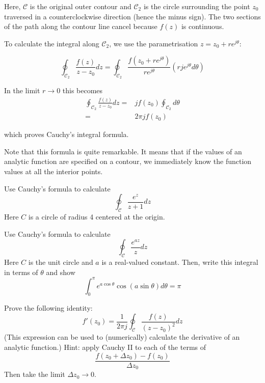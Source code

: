 Here, $\mathcal{C}$ is the original outer contour and $\mathcal{C}_2$ is the
circle surrounding the point $z_0$ traversed in a counterclockwise direction
(hence the minus sign). The two sections of the path along the contour line
cancel because $f(z)$ is continuous.

To calculate the integral along $\mathcal{C}_2$, we use the parametrisation
$z=z_0 + r e^{j\theta}$:

\begin{equation}
\oint_{\mathcal{C}_2} \frac{f(z)} {z-z_0} dz = \oint_{\mathcal{C}_2} \frac{f(z_0
+ r e^{j\theta})} {r e^{j\theta}} \left(rje^{j \theta} d \theta\right)
\end{equation}

In the limit $ r \to 0 $ this becomes
\begin{align}
\oint_{\mathcal{C}_2} \frac{f(z)} {z-z_0} dz = & j f(z_0) \oint_{\mathcal{C}_2}
d \theta \nonumber \\
 = &2 \pi j f(z_0)
\end{align}
 
which proves Cauchy's integral formula.

Note that this formula is quite remarkable. It means that if the values of an
analytic function are specified on a contour, we immediately know the function
values at all the interior points.

\begin{sidebar}
\begin{ex}
Use Cauchy's formula to calculate 
$$\oint_{\mathcal{C}}  \frac {e^z} {z+1} dz$$
Here $C$ is a circle of radius 4 centered at the origin. 
\end{ex}
\end{sidebar}

\begin{sidebar}
\begin{ex}
Use Cauchy's formula to calculate 
$$\oint_{\mathcal{C}}  \frac {e^{az}} {z} dz$$
Here $C$ is the unit circle and $a$ is a real-valued constant. Then, write this integral in terms of $\theta$ and show
$$ \int_0^\pi e ^{a \cos \theta} \cos (a \sin \theta) d\theta = \pi $$ 
\end{ex}
\end{sidebar}


\begin{sidebar}
\begin{ex}
Prove the following identity:
$$f'(z_0)=\frac{1}{2 \pi j} \oint_{\mathcal{C}} \frac{f(z)} {(z-z_0)^2} dz$$
(This expression can be used to (numerically) calculate the derivative of an analytic function.)
Hint: apply Cauchy II to each of the terms of
$$\frac{f(z_0+\Delta z_0) - f(z_0)}{\Delta z_0}$$
Then take the limit ${\Delta z_0} \to 0$.
\label{ex-cauchy-diff}
\end{ex}
\end{sidebar}

